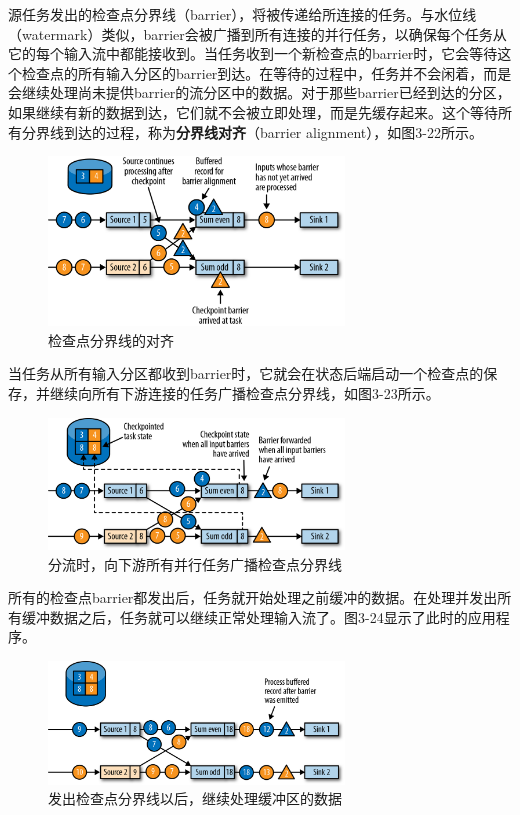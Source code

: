 \documentclass[cn,11pt,chinese]{elegantbook}
\begin{document}
源任务发出的检查点分界线（barrier），将被传递给所连接的任务。与水位线（watermark）类似，barrier会被广播到所有连接的并行任务，以确保每个任务从它的每个输入流中都能接收到。当任务收到一个新检查点的barrier时，它会等待这个检查点的所有输入分区的barrier到达。在等待的过程中，任务并不会闲着，而是会继续处理尚未提供barrier的流分区中的数据。对于那些barrier已经到达的分区，如果继续有新的数据到达，它们就不会被立即处理，而是先缓存起来。这个等待所有分界线到达的过程，称为\textbf{分界线对齐}（barrier alignment），如图3-22所示。

\begin{figure}[htbp]
    \centering
    \includegraphics[width=0.7\textwidth]{images/spaf_0322.png}
    \caption{检查点分界线的对齐}
\end{figure}

当任务从所有输入分区都收到barrier时，它就会在状态后端启动一个检查点的保存，并继续向所有下游连接的任务广播检查点分界线，如图3-23所示。

\begin{figure}[htbp]
    \centering
    \includegraphics[width=0.7\textwidth]{images/spaf_0323.png}
    \caption{分流时，向下游所有并行任务广播检查点分界线}
\end{figure}

所有的检查点barrier都发出后，任务就开始处理之前缓冲的数据。在处理并发出所有缓冲数据之后，任务就可以继续正常处理输入流了。图3-24显示了此时的应用程序。

\begin{figure}[htbp]
    \centering
    \includegraphics[width=0.7\textwidth]{images/spaf_0324.png}
    \caption{发出检查点分界线以后，继续处理缓冲区的数据}
\end{figure}
\end{document}
